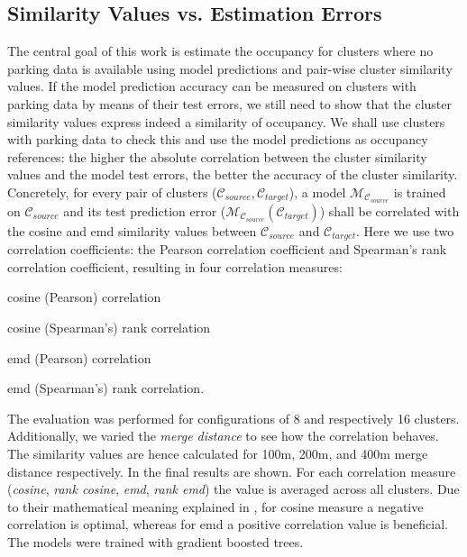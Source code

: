 \subsection{Similarity Values vs. Estimation Errors}
\label{evaluation:similarity_vs_estimation_sec}
The central goal of this work is estimate the occupancy for clusters where no parking data is available using model predictions and pair-wise cluster similarity values. If the model prediction accuracy can be measured on clusters with parking data by means of their test errors, we still need to show that the cluster similarity values express indeed a similarity of occupancy. We shall use clusters with parking data to check this and use the model predictions as occupancy references: the higher the absolute correlation between the cluster similarity values and the model test errors, the better the accuracy of the cluster similarity. Concretely, for every pair of clusters ($\mathcal{C}_{source}, \mathcal{C}_{target}$), a model $\mathcal{M}_{\mathcal{C}_{source}}$ is trained on $\mathcal{C}_{source}$ and its test prediction 
error ($\mathcal{M}_{\mathcal{C}_{source}}(\mathcal{C}_{target})$) shall be correlated with the cosine and emd similarity values between $\mathcal{C}_{source}$ and $\mathcal{C}_{target}$. Here we use two correlation coefficients: the Pearson correlation coefficient and Spearman's rank correlation coefficient, resulting in four correlation measures: 
\begin{romanlist}
	\item	cosine (Pearson) correlation
	\item 	cosine (Spearman's) rank correlation
	\item 	emd (Pearson) correlation
	\item 	emd (Spearman's) rank correlation. 
\end{romanlist}
The evaluation was performed for configurations of 8 and respectively 16 clusters. Additionally, we varied the \textit{merge distance} to see how the correlation behaves. The similarity values are hence calculated for 100m, 200m, and 400m merge distance respectively. In  the final results are shown. For each correlation measure (\textit{cosine}, \textit{rank cosine}, \textit{emd}, \textit{rank emd}) the value is averaged across all clusters. Due to their mathematical meaning explained in , for cosine measure a negative correlation is optimal, whereas for emd a positive correlation value is beneficial. The models were trained with gradient boosted trees. 
	
